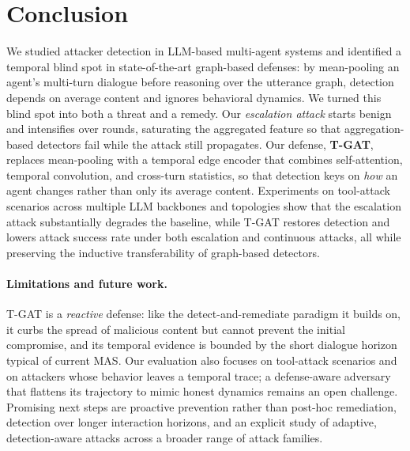 \section{Conclusion}
\label{sec:conclusion}


We studied attacker detection in LLM-based multi-agent systems and identified a
temporal blind spot in state-of-the-art graph-based defenses: by mean-pooling an
agent's multi-turn dialogue before reasoning over the utterance graph, detection
depends on average content and ignores behavioral dynamics. We turned this blind
spot into both a threat and a remedy. Our \emph{escalation attack} starts benign
and intensifies over rounds, saturating the aggregated feature so that
aggregation-based detectors fail while the attack still propagates. Our defense,
\textbf{T-GAT}, replaces mean-pooling with a temporal edge encoder that combines
self-attention, temporal convolution, and cross-turn statistics, so that
detection keys on \emph{how} an agent changes rather than only its average
content. Experiments on tool-attack scenarios across multiple LLM backbones and
topologies show that the escalation attack substantially degrades the baseline,
while T-GAT restores detection and lowers attack success rate under both
escalation and continuous attacks, all while preserving the inductive
transferability of graph-based detectors.

\paragraph{Limitations and future work.}
T-GAT is a \emph{reactive} defense: like the detect-and-remediate paradigm it
builds on, it curbs the spread of malicious content but cannot prevent the initial
compromise, and its temporal evidence is bounded by the short dialogue horizon
typical of current MAS. Our evaluation also focuses on tool-attack scenarios and
on attackers whose behavior leaves a temporal trace; a defense-aware adversary
that flattens its trajectory to mimic honest dynamics remains an open challenge.
Promising next steps are proactive prevention rather than post-hoc remediation,
detection over longer interaction horizons, and an explicit study of adaptive,
detection-aware attacks across a broader range of attack families.
